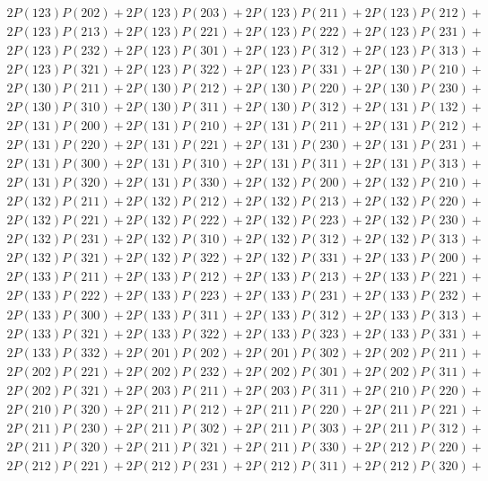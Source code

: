 \begin{align*}
	2P(123)P(202) + 2P(123)P(203) + 2P(123)P(211) + 2P(123)P(212)+ \\ 
	2P(123)P(213) + 2P(123)P(221) + 2P(123)P(222) + 2P(123)P(231)+ \\ 
	2P(123)P(232) + 2P(123)P(301) + 2P(123)P(312) + 2P(123)P(313)+ \\ 
	2P(123)P(321) + 2P(123)P(322) + 2P(123)P(331) + 2P(130)P(210)+ \\ 
	2P(130)P(211) + 2P(130)P(212) + 2P(130)P(220) + 2P(130)P(230)+ \\ 
	2P(130)P(310) + 2P(130)P(311) + 2P(130)P(312) + 2P(131)P(132)+ \\ 
	2P(131)P(200) + 2P(131)P(210) + 2P(131)P(211) + 2P(131)P(212)+ \\ 
	2P(131)P(220) + 2P(131)P(221) + 2P(131)P(230) + 2P(131)P(231)+ \\ 
	2P(131)P(300) + 2P(131)P(310) + 2P(131)P(311) + 2P(131)P(313)+ \\ 
	2P(131)P(320) + 2P(131)P(330) + 2P(132)P(200) + 2P(132)P(210)+ \\ 
	2P(132)P(211) + 2P(132)P(212) + 2P(132)P(213) + 2P(132)P(220)+ \\ 
	2P(132)P(221) + 2P(132)P(222) + 2P(132)P(223) + 2P(132)P(230)+ \\ 
	2P(132)P(231) + 2P(132)P(310) + 2P(132)P(312) + 2P(132)P(313)+ \\ 
	2P(132)P(321) + 2P(132)P(322) + 2P(132)P(331) + 2P(133)P(200)+ \\ 
	2P(133)P(211) + 2P(133)P(212) + 2P(133)P(213) + 2P(133)P(221)+ \\ 
	2P(133)P(222) + 2P(133)P(223) + 2P(133)P(231) + 2P(133)P(232)+ \\ 
	2P(133)P(300) + 2P(133)P(311) + 2P(133)P(312) + 2P(133)P(313)+ \\ 
	2P(133)P(321) + 2P(133)P(322) + 2P(133)P(323) + 2P(133)P(331)+ \\ 
	2P(133)P(332) + 2P(201)P(202) + 2P(201)P(302) + 2P(202)P(211)+ \\ 
	2P(202)P(221) + 2P(202)P(232) + 2P(202)P(301) + 2P(202)P(311)+ \\ 
	2P(202)P(321) + 2P(203)P(211) + 2P(203)P(311) + 2P(210)P(220)+ \\ 
	2P(210)P(320) + 2P(211)P(212) + 2P(211)P(220) + 2P(211)P(221)+ \\ 
	2P(211)P(230) + 2P(211)P(302) + 2P(211)P(303) + 2P(211)P(312)+ \\ 
	2P(211)P(320) + 2P(211)P(321) + 2P(211)P(330) + 2P(212)P(220)+ \\ 
	2P(212)P(221) + 2P(212)P(231) + 2P(212)P(311) + 2P(212)P(320)+ \\ 

\end{align*}
